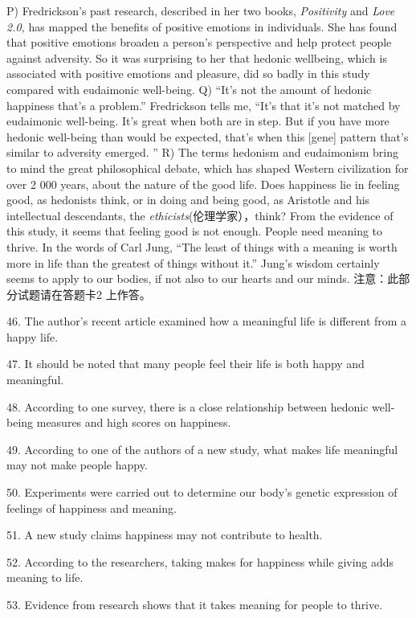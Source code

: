 \documentclass[UTF8,11pt]{ctexart}
\begin{document}
P) Fredrickson’s past research, described in her two books,\textit{ Positivity} and\textit{ Love 2.0,} has mapped the benefits of positive emotions in individuals. She has found that positive emotions broaden a person’s perspective and help protect people against adversity. So it was surprising to her that hedonic wellbeing, which is associated with positive emotions and pleasure, did so badly in this study compared with eudaimonic well-being. Q) “It’s not the amount of hedonic happiness that’s a problem.” Fredrickson tells me, “It’s that it’s not matched by eudaimonic well-being. It’s great when both are in step. But if you have more hedonic well-being than would be expected, that’s when this [gene] pattern that’s similar to adversity emerged. ” R) The terms hedonism and eudaimonism bring to mind the great philosophical debate, which has shaped Western civilization for over 2 000 years, about the nature of the good life. Does happiness lie in feeling good, as hedonists think, or in doing and being good, as Aristotle and his intellectual descendants, the\textit{ ethicists}(伦理学家），think? From the evidence of this study, it seems that feeling good is not enough. People need meaning to thrive. In the words of Carl Jung, “The least of things with a meaning is worth more in life than the greatest of things without it.” Jung’s wisdom certainly seems to apply to our bodies, if not also to our hearts and our minds. 注意：此部分试题请在答题卡2 上作答。


46. The author’s recent article examined how a meaningful life is different from a happy life.


47. It should be noted that many people feel their life is both happy and meaningful.


48. According to one survey, there is a close relationship between hedonic well-being measures and high scores on happiness.


49. According to one of the authors of a new study, what makes life meaningful may not make people happy.


50. Experiments were carried out to determine our body’s genetic expression of feelings of happiness and meaning.


51. A new study claims happiness may not contribute to health.


52. According to the researchers, taking makes for happiness while giving adds meaning to life.


53. Evidence from research shows that it takes meaning for people to thrive.
\end{document}
